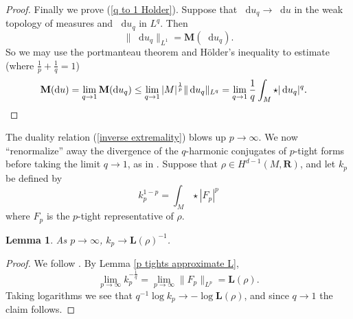 \documentclass[reqno,11pt]{amsart}
\newcommand{\RR}{\mathbf{R}}
\newcommand*\dif{\mathop{}\!\mathrm{d}}
\newcommand{\Mass}{\mathbf M}
\newcommand{\Comass}{\mathbf L}
\newtheorem{lemma}[theorem]{Lemma}
\theoremstyle{definition}
\numberwithin{equation}{section}
\begin{document}
\begin{proof}
Finally we prove (\ref{q to 1 Holder}).
Suppose that $\dif u_q \to \dif u$ in the weak topology of measures and $\dif u_q$ in $L^q$.
Then
$$\|\dif u_q\|_{L^1} = \Mass(\dif u_q).$$
So we may use the portmanteau theorem and H\"older's inequality to estimate (where $\frac{1}{p} + \frac{1}{q} = 1$)
\begin{align*}
\Mass(\dif u) &= \lim_{q \to 1} \Mass(\dif u_q) \leq \lim_{q \to 1} |M|^{\frac{1}{p}} \|\dif u_q\|_{L^q} = \lim_{q \to 1} \frac{1}{q} \int_M \star |\dif u_q|^q. \qedhere
\end{align*}
\end{proof}

The duality relation (\ref{inverse extremality}) blows up $p \to \infty$.
We now ``renormalize'' away the divergence of the $q$-harmonic conjugates of $p$-tight forms before taking the limit $q \to 1$, as in \cite[\S3.2]{daskalopoulos2020transverse}.
Suppose that $\rho \in H^{d - 1}(M, \RR)$, and let $k_p$ be defined by 
$$k_p^{1 - p} = \int_M \star |F_p|^p$$
where $F_p$ is the $p$-tight representative of $\rho$.

\begin{lemma}\label{normalizations converge}
As $p \to \infty$, $k_p \to \Comass(\rho)^{-1}$.
\end{lemma}
\begin{proof}
We follow \cite[Lemma 3.4]{daskalopoulos2020transverse}.
By Lemma \ref{p tights approximate L},
$$\lim_{p \to \infty} k_p^{-\frac{1}{q}} = \lim_{p \to \infty} \|F_p\|_{L^p} = \Comass(\rho).$$
Taking logarithms we see that $q^{-1} \log k_p \to -\log \Comass(\rho)$, and since $q \to 1$ the claim follows.
\end{proof}
\end{document}
